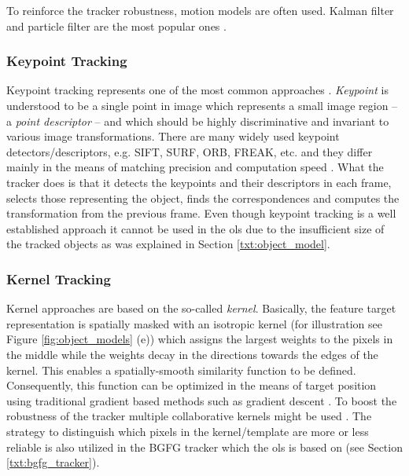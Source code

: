 To reinforce the tracker robustness, motion models are often used. Kalman filter and particle filter are the most popular ones \cite{cuevas2005kalman, ObjectTrackinginMonochromaticVideo}.


\subsubsection*{Keypoint Tracking} 
Keypoint tracking represents one of the most common approaches \cite{Tomasi91detectionand,Nebehay2014WACV}. \textit{Keypoint} is understood to be a single point in image which represents a small image region -- a \textit{point descriptor} -- and which should be highly discriminative and invariant to various image transformations. There are many widely used keypoint detectors/descriptors, e.g. SIFT, SURF, ORB, FREAK, etc. \cite{sift, Bay:2008:SRF:1370312.1370556, Rublee:2011:OEA:2355573.2356268, Ortiz:2012:FFR:2354409.2354903} and they differ mainly in the means of matching precision and computation speed \cite{Schaeffer_acomparison, conf/icpr/MiksikM12}. What the tracker does is that it detects the keypoints and their descriptors in each frame, selects those representing the object, finds the correspondences and computes the transformation from the previous frame. Even though keypoint tracking is a well established approach it cannot be used in the \gls{ols} due to the insufficient size of the tracked objects as was explained in Section \ref{txt:object_model}.

\subsubsection*{Kernel Tracking}
Kernel approaches are based on the so-called \textit{kernel}. Basically, the feature target representation is spatially masked with an isotropic kernel (for illustration see Figure \ref{fig:object_models} (e)) which assigns the largest weights to the pixels in the middle while the weights decay in the directions towards the edges of the kernel. This enables a spatially-smooth similarity function to be defined. Consequently, this function can be optimized in the means of target position using traditional gradient based methods such as gradient descent \cite{Comaniciu:2003:KOT:776753.776799}. To boost the robustness of the tracker multiple collaborative kernels might be used \cite{MultipleCollaborativeKernelTracking, Multi-kernelCorrelationFilterForVisualTracking}. The strategy to distinguish which pixels in the kernel/template are more or less reliable is also utilized in the BGFG tracker which the \gls{ols} is based on (see Section \ref{txt:bgfg_tracker}).

